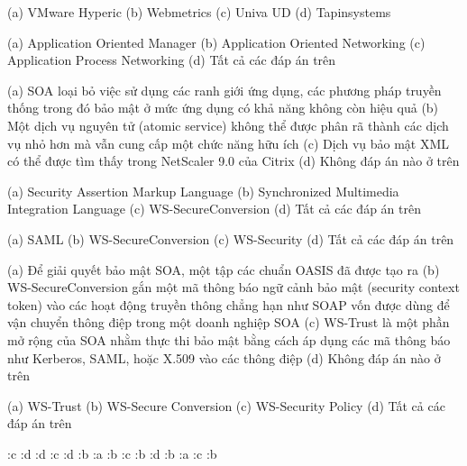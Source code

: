 {(a) VMware Hyperic}
{(b) Webmetrics}
{(c) Univa UD}
{(d) Tapinsystems}

{(a) Application Oriented Manager}
{(b) Application Oriented Networking}
{(c) Application Process Networking}
{(d) Tất cả các đáp án trên}

{(a) SOA loại bỏ việc sử dụng các ranh giới ứng dụng, các phương pháp truyền thống trong đó bảo mật ở mức ứng dụng có khả năng không còn hiệu quả}
{(b) Một dịch vụ nguyên tử (atomic service) không thể được phân rã thành các dịch vụ nhỏ hơn mà vẫn cung cấp một chức năng hữu ích}
{(c) Dịch vụ bảo mật XML có thể được tìm thấy trong NetScaler 9.0 của Citrix}
{(d) Không đáp án nào ở trên}

{(a) Security Assertion Markup Language}
{(b) \textenglish{Synchronized Multimedia Integration Language}}
{(c) WS-SecureConversion}
{(d) Tất cả các đáp án trên}

{(a) SAML}
{(b) WS-SecureConversion}
{(c) WS-Security}
{(d) Tất cả các đáp án trên}

{(a) Để giải quyết bảo mật SOA, một tập các chuẩn OASIS đã được tạo ra}
{(b) WS-SecureConversion gắn một mã thông báo ngữ cảnh bảo mật (security context token) vào các hoạt động truyền thông chẳng hạn như SOAP vốn được dùng để vận chuyển thông điệp trong một doanh nghiệp SOA}
{(c) WS-Trust là một phần mở rộng của SOA nhằm thực thi bảo mật bằng cách áp dụng các mã thông báo như Kerberos, SAML, hoặc X.509 vào các thông điệp}
{(d) Không đáp án nào ở trên}

{(a) WS-Trust}
{(b) WS-Secure Conversion}
{(c) WS-Security Policy}
{(d) Tất cả các đáp án trên}


:c :d :d :c :d :b :a :b :c :b :d :b :a :c :b


